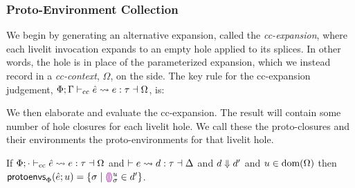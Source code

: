 \subsubsection{Proto-Environment Collection}
We begin by generating an alternative expansion,
called the \emph{cc-expansion},
where each livelit invocation expands to an empty hole applied to its splices. In other words,
the hole is in place of the parameterized expansion, which we instead record in a \emph{cc-context}, $\Omega$, on the side.
The key rule for the cc-expansion judgement, $\ccexpands{\Phi}{\Gamma}{\hat e}{e}{\tau}{\Omega}$, is:
\begin{mathpar}
\end{mathpar}

We then elaborate and evaluate the cc-expansion. 
The result will contain some number of hole closures
for each livelit hole. We call these the proto-closures and their environments the proto-environments for that livelit hole.
\begin{definition}
If $\ccexpands{\Phi}{\cdot}{\hat e}{e}{\tau}{\Omega}$ and $\elabs{}{e}{d}{\tau}{\Delta}$
and $\evalsTo{d}{d'}$ and $u \in \domof{\Omega}$ then $\protoEnvsOf{\Phi}{\hat e}{u} = \{ \sigma \mid \dehole{u}{\sigma} \in d' \}$.
\end{definition}

